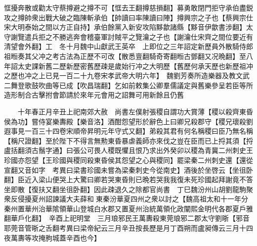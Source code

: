 恇擾奔散或勸太守蔡撙避之撙不可【恇去王翻撙慈損翻】募勇敢閉門拒守承伯盡鋭攻之撙帥衆出戰大破之臨陳斬承伯【帥讀曰率陳讀曰陣】撙興宗之子也【蔡興宗仕宋大明泰始之間以方正自持】承伯餘黨入新安攻陷黟歙諸縣【黟音伊歙書涉翻】太守謝覽遣兵拒之不勝逃奔會稽臺軍討賊平之覽瀹之子也【謝瀹仕宋齊之間位要近有清望會外翻】工　冬十月魏中山獻武王英卒　上即位之三年詔定新歷員外散騎侍郎祖暅奏其父冲之考古法為正歷不可改【散悉亶翻騎奇寄翻暅古鄧翻又况晩翻】至八年詔太史課新舊二歷新歷密舊歷疎是歲始行冲之大明歷【舊歷何承天歷也新歷祖冲之歷也冲之上已見一百二十九卷宋孝武帝大明六年】　魏劉芳奏所造樂器及教文武二舞登歌鼓吹曲等已成【吹昌瑞翻】乞如前敕集公卿羣儒議定與舊樂參呈若臣等所造形制合古擊拊會節請於來年元會用之詔舞可用新餘且仍舊

　　十年春正月辛丑上祀南郊大赦　尚書左僕射張稷自謂功大賞薄【稷以殺齊東昏侯為功】嘗侍宴樂夀殿【樂音洛】酒酣怨望形於辭色上曰卿兄殺郡守【稷兄瓌殺劉遐事見一百三十四卷宋順帝昇明元年守式又翻】弟殺其君有何名稱稷曰臣乃無名稱【稱尺證翻】至於陛下不得言無勲東昏暴虐義師亦來伐之豈在臣而已上捋其須【捋盧括翻須古鬚字通】曰張公可畏人稷既懼且恨乃求出外癸卯以稷為青冀二州刺史王珍國亦怨望【王珍國與稷同殺東昏侯其怨望之心與稷同】罷梁秦二州刺史還【還從宣翻又音如字　考異曰梁書珍國未嘗為梁秦刺史今從南史】酒後於坐啓云【坐徂卧翻】臣近入梁山便哭上大驚曰卿若哭東昏則已晩若哭我我復未死珍國起拜謝竟不答坐即散【復扶又翻坐徂卧翻】因此疎退久之除都官尚書　丁巳魏汾州山胡劉龍駒聚衆反侵擾夏州詔諫議大夫薛和東秦汾華夏四州之衆以討之【魏高祖太和十一年分秦州置華州治華隂領華山登城白水郡又置夏州治統萬領化政闡熙金明代各郡夏戶雅翻華戶化翻】　辛酉上祀明堂　三月琅邪民王萬夀殺東莞琅邪二郡太守劉晣【邪音耶莞音管晣之舌翻考異曰梁帝紀云三月辛丑按長歷是月丁酉朔而盧昶傳云三月十四夜萬夀等攻掩朐城蓋辛酉也今】

